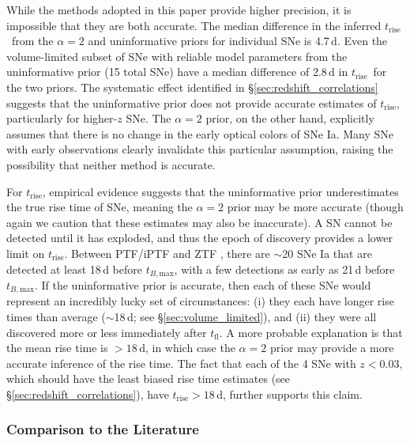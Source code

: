 \documentclass[twocolumn]{aastex63}
\newcommand{\tfl}{$t_\mathrm{fl}$}
\newcommand{\trise}{$t_\mathrm{rise}$}
\newcommand{\tbmax}{$t_{B,\mathrm{max}}$}
\begin{document}
While the methods adopted in this paper provide higher precision, it is
impossible that they are both accurate. The median difference in the inferred
\trise\ from the $\alpha = 2$ and uninformative priors for individual SNe is
4.7\,d. Even the volume-limited subset of SNe with reliable model parameters
from the uninformative prior (15 total SNe) have a median difference of 2.8\,d
in \trise\ for the two priors. The systematic effect identified in
\S\ref{sec:redshift_correlations} suggests that the uninformative prior does
not provide accurate estimates of \trise, particularly for higher-$z$ SNe. The
$\alpha = 2$ prior, on the other hand, explicitly assumes that there is no
change in the early optical colors of SNe Ia. Many SNe with early observations
clearly invalidate this particular assumption, raising the possibility that
neither method is accurate.

For \trise, empirical evidence suggests that the uninformative prior
underestimates the true rise time of SNe, meaning the $\alpha = 2$ prior may
be more accurate (though again we caution that these estimates may also be
inaccurate). A SN cannot be detected until it has exploded, and thus the epoch
of discovery provides a lower limit on \trise. Between PTF/iPTF
\citep{Papadogiannakis19} and ZTF \citep{Yao19}, there are $\sim$20 SNe Ia
that are detected at least 18\,d before \tbmax, with a few detections as early
as 21\,d before \tbmax. If the uninformative prior is accurate, then each of
these SNe would represent an incredibly lucky set of circumstances: (i) they
each have longer rise times than average ($\sim$18\,d; see
\S\ref{sec:volume_limited}), and (ii) they were all discovered more or less
immediately after \tfl. A more probable explanation is that the mean rise time
is $> 18$\,d, in which case the $\alpha = 2$ prior may provide a more accurate
inference of the rise time. The fact that each of the 4 SNe with $z < 0.03$,
which should have the least biased rise time estimates (see
\S\ref{sec:redshift_correlations}), have \trise$ > 18$\,d, further supports
this claim.

\subsubsection{Comparison to the Literature}
\end{document}
